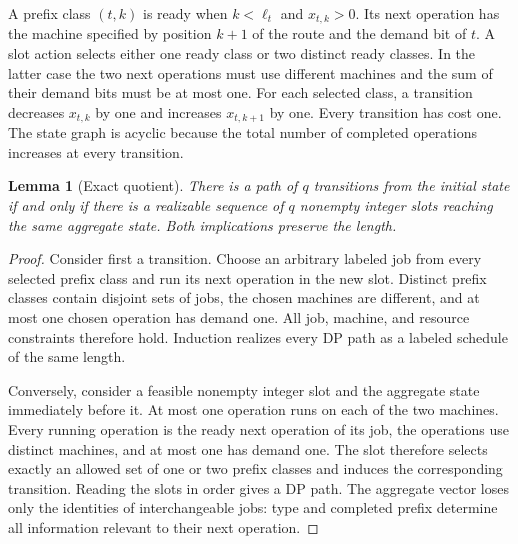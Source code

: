 \documentclass[11pt]{article}
\newtheorem{lemma}[theorem]{Lemma}
\begin{document}
A prefix class $(t,k)$ is ready when $k<\ell_t$ and $x_{t,k}>0$.  Its next
operation has the machine specified by position $k+1$ of the route and the
demand bit of $t$.  A slot action selects either one ready class or two
distinct ready classes.  In the latter case the two next operations must use
different machines and the sum of their demand bits must be at most one.  For
each selected class, a transition decreases $x_{t,k}$ by one and increases
$x_{t,k+1}$ by one.  Every transition has cost one.  The state graph is
acyclic because the total number of completed operations increases at every
transition.

\begin{lemma}[Exact quotient]\label{lem:quotient}
There is a path of $q$ transitions from the initial state if and only if
there is a realizable sequence of $q$ nonempty integer slots reaching the
same aggregate state.  Both implications preserve the length.
\end{lemma}

\begin{proof}
Consider first a transition.  Choose an arbitrary labeled job from every
selected prefix class and run its next operation in the new slot.  Distinct
prefix classes contain disjoint sets of jobs, the chosen machines are
different, and at most one chosen operation has demand one.  All job,
machine, and resource constraints therefore hold.  Induction realizes every
DP path as a labeled schedule of the same length.

Conversely, consider a feasible nonempty integer slot and the aggregate state
immediately before it.  At most one operation runs on each of the two
machines.  Every running operation is the ready next operation of its job,
the operations use distinct machines, and at most one has demand one.  The
slot therefore selects exactly an allowed set of one or two prefix classes
and induces the corresponding transition.  Reading the slots in order gives
a DP path.  The aggregate vector loses only the identities of interchangeable
jobs: type and completed prefix determine all information relevant to their
next operation.
\end{proof}
\end{document}
